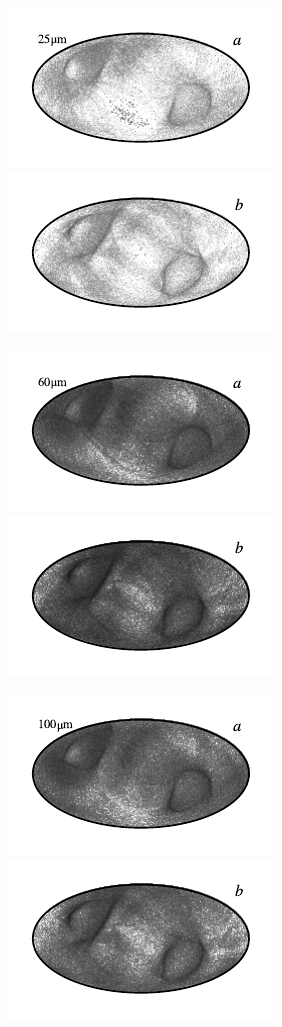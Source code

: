 \documentclass{aa}
\begin{document}
\begin{figure}
	\includegraphics{figs/rms_maps/rms_06a_c0001_000019.pdf}\includegraphics{figs/rms_maps/rms_06b_c0001_000019.pdf}
  \vspace*{-0.85cm}

	\includegraphics{figs/rms_maps/rms_07a_c0001_000019.pdf}\includegraphics{figs/rms_maps/rms_07b_c0001_000019.pdf}
  \vspace*{-0.85cm}

	\includegraphics{figs/rms_maps/rms_08a_c0001_000019.pdf}\includegraphics{figs/rms_maps/rms_08b_c0001_000019.pdf}
  \vspace*{-0.85cm}


\end{figure}
\end{document}
